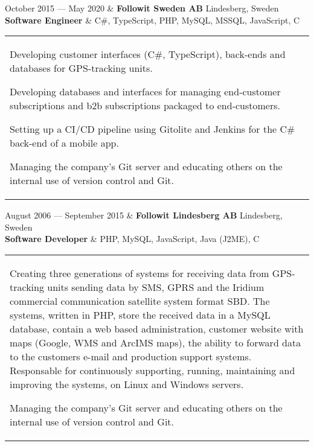 \documentclass{cv-stylish}
\begin{document}
\begin{center}
\begin{JobTable}
  October 2015 --- May 2020 & \textbf{Followit Sweden AB} \hfill
Lindesberg, Sweden \\[3pt]
  \hspace{5mm} \textbf{Software Engineer}
  & \hfill C\#, TypeScript, PHP, MySQL, MSSQL, JavaScript, C \\
\end{JobTable}
\begin{tabularx}{0.97\linewidth}{X}
\begin{compactitem}
  \item Developing customer interfaces (C\#, TypeScript), back-ends
    and databases for GPS-tracking units.
  \item Developing databases and interfaces for managing end-customer
    subscriptions and b2b subscriptions packaged to end-customers.
  \item Setting up  a CI/CD pipeline using Gitolite and Jenkins for the C\#
    back-end of a mobile app.
  \item Managing the company's Git server and educating others on the
    internal use of version control and Git.
\end{compactitem}
\end{tabularx}

\begin{JobTable}
  August 2006 --- September 2015 & \textbf{Followit Lindesberg AB}
  \hfill Lindesberg, Sweden \\[3pt]
  \hspace{5mm} \textbf{Software Developer} & \hfill PHP, MySQL,
  JavaScript, Java (J2ME), C \\
\end{JobTable}
\begin{tabularx}{0.97\linewidth}{X}
\begin{compactitem}
  \item Creating three generations of systems for receiving data from
    GPS-tracking units sending data by SMS, GPRS and the Iridium
    commercial communication satellite system format SBD.
    The systems, written in PHP, store the received data in a MySQL
    database, contain a web based administration, customer website
    with maps (Google, WMS and ArcIMS maps), the ability to forward
    data to the customers e-mail and production support
    systems. Responsable for continuously supporting, running,
    maintaining and improving the systems, on Linux and Windows
    servers.
  \item Managing the company's Git server and educating others on the
    internal use of version control and Git.
\end{compactitem}
\end{tabularx}



\end{center}
\end{document}
